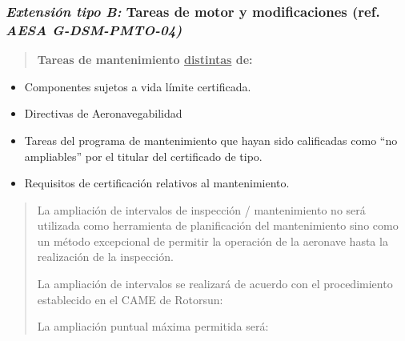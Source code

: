 \documentclass[
]{article}
\begin{document}
\hypertarget{extensiuxf3n-tipo-b-tareas-de-motor-y-modificaciones-ref.-aesa-g-dsm-pmto-04}{%
\subsubsection{\texorpdfstring{\emph{Extensión tipo B:} Tareas de motor
y modificaciones (ref. \emph{AESA
G-DSM-PMTO-04)}}{Extensión tipo B: Tareas de motor y modificaciones (ref. AESA G-DSM-PMTO-04)}}\label{extensiuxf3n-tipo-b-tareas-de-motor-y-modificaciones-ref.-aesa-g-dsm-pmto-04}}

\begin{quote}
\textbf{Tareas de mantenimiento \ul{distintas} de:}
\end{quote}

\begin{itemize}
\item
  Componentes sujetos a vida límite certificada.
\item
  Directivas de Aeronavegabilidad
\item
  Tareas del programa de mantenimiento que hayan sido calificadas como
  ``no ampliables'' por el titular del certificado de tipo.
\item
  Requisitos de certificación relativos al mantenimiento.
\end{itemize}

\begin{quote}
La ampliación de intervalos de inspección / mantenimiento no será
utilizada como herramienta de planificación del mantenimiento sino como
un método excepcional de permitir la operación de la aeronave hasta la
realización de la inspección.

La ampliación de intervalos se realizará de acuerdo con el procedimiento
establecido en el CAME de Rotorsun:

\newpage

La ampliación puntual máxima permitida será:
\end{quote}
\end{document}
